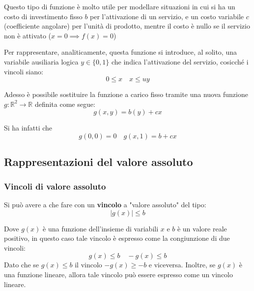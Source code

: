 Questo tipo di funzione è molto utile per modellare situazioni in cui si ha un costo di investimento fisso $b$ per l'attivazione di un servizio, e un costo variabile $c$ (coefficiente angolare) per l'unità di prodotto, mentre il costo è nullo se il servizio non è attivato ($x= 0 \implies f(x) = 0$)

Per rappresentare, analiticamente, questa funzione si introduce, al solito, una variabile ausiliaria logica $y\in \{0,1\}$ che indica l'attivazione del servizio, cosicché i vincoli siano:
\[
  0\leq x \quad x \leq uy 
\]

Adesso è possibile sostituire la funzione a carico fisso tramite una nuova funzione $g:\mathbb{R}^2\to\mathbb{R}$ definita come segue:
\[
  g(x,y) = b(y) + cx
\]

Si ha infatti che
\[
  g(0,0) = 0 \quad g(x,1) = b + cx
\]


\subsection{Rappresentazioni del valore assoluto}

\subsubsection{Vincoli di valore assoluto}
Si può avere a che fare con un \textbf{vincolo} a "valore assoluto" del tipo:
\[
  |g(x)| \leq b
\]

Dove $g(x)$ è una funzione dell'insieme di variabili $x$ e $b$ è un valore reale positivo, in questo caso tale vincolo è espresso come la congiunzione di due vincoli:
\[
  g(x)\leq b \quad -g(x)\leq b
\]
Dato che se $g(x)\leq b$ il vincolo $-g(x)\geq -b$ e viceversa. Inoltre, se $g(x)$ è una funzione lineare, allora tale vincolo può essere espresso come un vincolo lineare.

